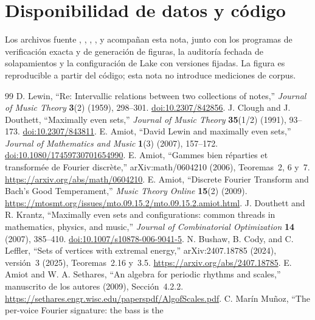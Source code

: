 \documentclass[11pt]{article}
\begin{document}
\section*{Disponibilidad de datos y código}
Los archivos fuente , ,
, ,  y
 acompañan esta nota, junto con los programas de
verificación exacta y de generación de figuras, la auditoría fechada de solapamientos
y la configuración de Lake con versiones fijadas. La figura es reproducible a partir
del código; esta nota no introduce mediciones de corpus.

\FloatBarrier
\begin{thebibliography}{99}\small
\setlength{\itemsep}{3pt}
 D. Lewin, ``Re: Intervallic relations between two collections of notes,''
\emph{Journal of Music Theory} \textbf{3}(2) (1959), 298--301.
\href{https://doi.org/10.2307/842856}{doi:10.2307/842856}.
 J. Clough and J. Douthett, ``Maximally even sets,''
\emph{Journal of Music Theory} \textbf{35}(1/2) (1991), 93--173.
\href{https://doi.org/10.2307/843811}{doi:10.2307/843811}.
 E. Amiot, ``David Lewin and maximally even sets,''
\emph{Journal of Mathematics and Music} \textbf{1}(3) (2007), 157--172.
\href{https://doi.org/10.1080/17459730701654990}{doi:10.1080/17459730701654990}.
 E. Amiot, ``Gammes bien r\'eparties et transform\'ee de Fourier discr\`ete,''
arXiv:math/0604210 (2006), Teoremas~2, 6 y~7.
\url{https://arxiv.org/abs/math/0604210}.
 E. Amiot, ``Discrete Fourier Transform and Bach's Good Temperament,''
\emph{Music Theory Online} \textbf{15}(2) (2009).
\url{https://mtosmt.org/issues/mto.09.15.2/mto.09.15.2.amiot.html}.
 J. Douthett and R. Krantz, ``Maximally even sets and configurations: common
threads in mathematics, physics, and music,'' \emph{Journal of Combinatorial Optimization}
\textbf{14} (2007), 385--410.
\href{https://doi.org/10.1007/s10878-006-9041-5}{doi:10.1007/s10878-006-9041-5}.
 N. Bushaw, B. Cody, and C. Leffler, ``Sets of vertices with extremal energy,''
arXiv:2407.18785 (2024), versión~3 (2025), Teoremas~2.16 y~3.5.
\url{https://arxiv.org/abs/2407.18785}.
 E. Amiot and W. A. Sethares, ``An algebra for periodic rhythms and scales,''
manuscrito de los autores (2009), Sección~4.2.2.
\url{https://sethares.engr.wisc.edu/paperspdf/AlgofScales.pdf}.
 C. Mar\'in Mu\~noz, ``The per-voice Fourier signature: the bass is the

\end{thebibliography}
\end{document}
